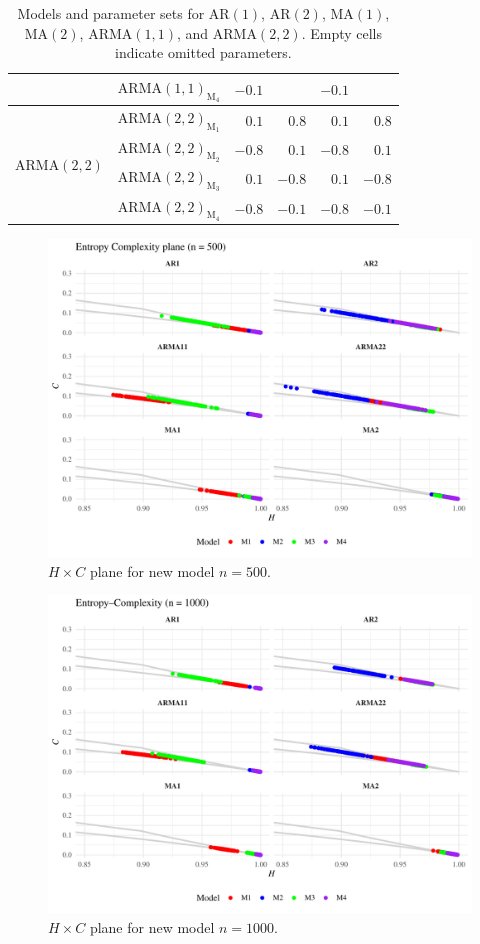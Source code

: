\documentclass[11pt,a4paper]{article}
\begin{document}
\begin{table}[hbt]
\begin{tabular}{llrrrr}
		& $\mathrm{ARMA}(1,1)_{\textrm{M}_4}$ & $-0.1$ &     & $-0.1$ &      \\
		\midrule
		\multirow{4}[2]{*}{$\mathrm{ARMA}(2,2)$}  & $\mathrm{ARMA}(2,2)_{\textrm{M}_1}$ & $0.1$ & $0.8$  & $0.1$  & $0.8$  \\
		& $\mathrm{ARMA}(2,2)_{\textrm{M}_2}$ & $-0.8$ & $0.1$ & $-0.8$ & $0.1$  \\
		& $\mathrm{ARMA}(2,2)_{\textrm{M}_3}$ & $0.1$ & $-0.8$ & $0.1$  & $-0.8$ \\
		& $\mathrm{ARMA}(2,2)_{\textrm{M}_4}$ & $-0.8$ & $-0.1$ & $-0.8$ & $-0.1$ \\
		\bottomrule
	\end{tabular}
	\caption{Models and parameter sets for $\mathrm{AR}(1)$, $\mathrm{AR}(2)$, $\mathrm{MA}(1)$, $\mathrm{MA}(2)$, $\mathrm{ARMA}(1,1)$, and $\mathrm{ARMA}(2,2)$. Empty cells indicate omitted parameters.}
	\label{table:summary}
\end{table}


\begin{figure}[H]
	\includegraphics[width=0.9 \textwidth]{New_model_group_plot_n500}
	\caption{$H \times C$ plane for new model $n=500$.}
	\label{fig:HC new n500}
\end{figure}

\begin{figure}[H]
	\includegraphics[width=0.9 \textwidth]{New_model_group_plot_n1000}
	\caption{$H \times C$ plane for new model $n=1000$.}
	\label{fig:HC new n1000}
\end{figure}
\end{document}
